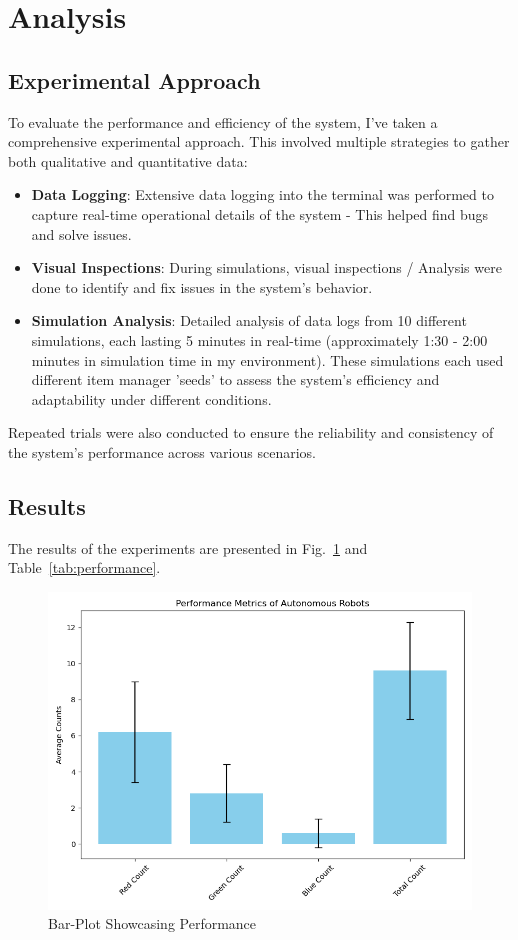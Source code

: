 \documentclass[conference]{IEEEtran}
\begin{document}
\section{Analysis}
\subsection{Experimental Approach}

To evaluate the performance and efficiency of the system, I've taken a comprehensive experimental approach. This involved multiple strategies to gather both qualitative and quantitative data:
\begin{itemize}
    \item \textbf{Data Logging}: Extensive data logging into the terminal was performed to capture real-time operational details of the system - This helped find bugs and solve issues.
    \item \textbf{Visual Inspections}: During simulations, visual inspections / Analysis were done to identify and fix issues in the system's behavior.
    \item \textbf{Simulation Analysis}: Detailed analysis of data logs from 10 different simulations, each lasting 5 minutes in real-time (approximately 1:30 - 2:00 minutes in simulation time in my environment). These simulations each used different item manager 'seeds' to assess the system's efficiency and adaptability under different conditions.
\end{itemize}
Repeated trials were also conducted to ensure the reliability and consistency of the system’s performance across various scenarios.


\subsection{Results}
The results of the experiments are presented in Fig.~\ref{fig:performancegraph} and Table~\ref{tab:performance}. 

\begin{figure}[htbp]
\centerline{\includegraphics[width=\linewidth]{performance_metrics.png}}
\caption{Bar-Plot Showcasing Performance }
\label{fig:performancegraph}
\end{figure}
\end{document}
